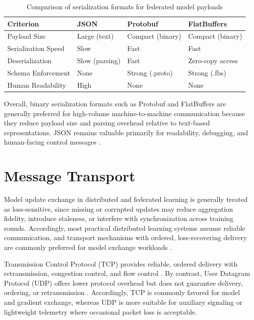 \begin{table}[H]
    \centering
    \begin{tabular}{|p{}|p{}|p{}|p{}|}
        \hline
        \textbf{Criterion} & \textbf{JSON} & \textbf{Protobuf} & \textbf{FlatBuffers} \\
        \hline
        Payload Size & Large (text) & Compact (binary) & Compact (binary) \\
        \hline
        Serialization Speed & Slow & Fast & Fast \\
        \hline
        Deserialization & Slow (parsing) & Fast & Zero-copy access \\
        \hline
        Schema Enforcement & None & Strong (.proto) & Strong (.fbs) \\
        \hline
        Human Readability & High & None & None \\
        \hline
    \end{tabular}
    \caption{Comparison of serialization formats for federated model payloads}
    \label{tab:serial_comparison}
\end{table}

Overall, binary serialization formats such as Protobuf and FlatBuffers are generally
preferred for high-volume machine-to-machine communication because they reduce payload
size and parsing overhead relative to text-based representations. JSON remains valuable
primarily for readability, debugging, and human-facing control messages
\cite{rfc8259, viotti2022benchmark, protobuf_overview, flatbuffers_whitepaper}.

\section{Message Transport}
\label{sec:transport}

Model update exchange in distributed and federated learning is generally treated as
loss-sensitive, since missing or corrupted updates may reduce aggregation fidelity,
introduce staleness, or interfere with synchronization across training rounds.
Accordingly, most practical distributed learning systems assume reliable communication,
and transport mechanisms with ordered, loss-recovering delivery are commonly preferred
for model exchange workloads \cite{yu2019distributed, mcmahan2017communication}.

Transmission Control Protocol (TCP) provides reliable, ordered delivery with 
retransmission, congestion control, and flow control \cite{rfc793}. By contrast, 
User Datagram Protocol (UDP) offers lower protocol overhead but does not guarantee 
delivery, ordering, or retransmission \cite{rfc768}. Accordingly, TCP is commonly 
favored for model and gradient exchange, whereas UDP is more suitable for auxiliary 
signaling or lightweight telemetry where occasional packet loss is acceptable.

